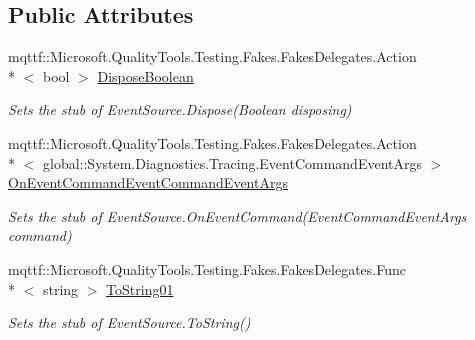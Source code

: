 \subsection*{Public Attributes}
\begin{DoxyCompactItemize}
\item 
mqttf\-::\-Microsoft.\-Quality\-Tools.\-Testing.\-Fakes.\-Fakes\-Delegates.\-Action\\*
$<$ bool $>$ \hyperlink{class_system_1_1_diagnostics_1_1_tracing_1_1_fakes_1_1_stub_event_source_a19664463da91c527d07b81580f79ff8b}{Dispose\-Boolean}
\begin{DoxyCompactList}\small\item\em Sets the stub of Event\-Source.\-Dispose(\-Boolean disposing)\end{DoxyCompactList}\item 
mqttf\-::\-Microsoft.\-Quality\-Tools.\-Testing.\-Fakes.\-Fakes\-Delegates.\-Action\\*
$<$ global\-::\-System.\-Diagnostics.\-Tracing.\-Event\-Command\-Event\-Args $>$ \hyperlink{class_system_1_1_diagnostics_1_1_tracing_1_1_fakes_1_1_stub_event_source_a0af612a99654866d89cd26007dc2cefa}{On\-Event\-Command\-Event\-Command\-Event\-Args}
\begin{DoxyCompactList}\small\item\em Sets the stub of Event\-Source.\-On\-Event\-Command(\-Event\-Command\-Event\-Args command)\end{DoxyCompactList}\item 
mqttf\-::\-Microsoft.\-Quality\-Tools.\-Testing.\-Fakes.\-Fakes\-Delegates.\-Func\\*
$<$ string $>$ \hyperlink{class_system_1_1_diagnostics_1_1_tracing_1_1_fakes_1_1_stub_event_source_a1b0d566393bda81576ad7ab6325a532d}{To\-String01}
\begin{DoxyCompactList}\small\item\em Sets the stub of Event\-Source.\-To\-String()\end{DoxyCompactList}\end{DoxyCompactItemize}
